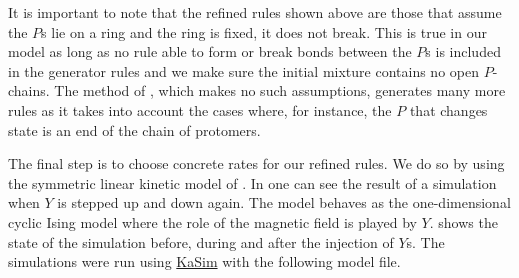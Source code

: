 It is important to note that the refined rules shown above
are those that assume the $P$s lie on a ring and the ring is fixed,
\ie it does not break.
This is true in our model
as long as no rule able to form or break bonds between the $P$s
is included in the generator rules
and we make sure the initial mixture contains no open $P$-chains.
The method of ,
which makes no such assumptions,
generates many more rules
as it takes into account the cases where,
for instance, the $P$ that changes state
is an end of the chain of protomers.


The final step is to choose concrete rates for our refined rules.
We do so by using the symmetric linear kinetic model of .
In  one can see the result of a simulation
when $Y$ is stepped up and down again.
The model behaves as the one-dimensional cyclic Ising model
where the role of the magnetic field is played by $Y$.
 shows the state of the simulation
before, during and after the injection of $Y$s.
The simulations were run using
\href{https://github.com/Kappa-Dev/KaSim}{KaSim}
with the following model file.

